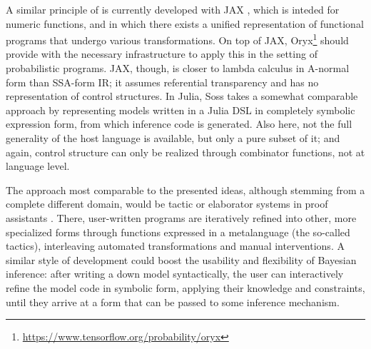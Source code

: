 A similar principle of is currently developed with JAX \parencite{bradbury2018jax}, which is inteded
for numeric functions, and in which there exists a unified representation of functional programs
that undergo various transformations.  On top of JAX,
Oryx\footnote{\protect\url{https://www.tensorflow.org/probability/oryx}} should provide with the
necessary infrastructure to apply this in the setting of probabilistic programs.  JAX, though, is
closer to lambda calculus in A-normal form than SSA-form IR; it assumes referential transparency and
has no representation of control structures.  In Julia, Soss \parencite{scherrer2019soss} takes a
somewhat comparable approach by representing models written in a Julia DSL in completely symbolic
expression form, from which inference code is generated.  Also here, not the full generality of the
host language is available, but only a pure subset of it; and again, control structure can only be
realized through combinator functions, not at language level.

The approach most comparable to the presented ideas, although stemming from a complete different
domain, would be tactic or elaborator systems in proof assistants
\parencite[e.g.,][]{brady2013idris,coqdevelopmentteam2010coq}.  There, user-written programs are
iteratively refined into other, more specialized forms through functions expressed in a metalanguage
(the so-called tactics), interleaving automated transformations and manual interventions.  A similar
style of development could boost the usability and flexibility of Bayesian inference: after writing
a down model syntactically, the user can interactively refine the model code in symbolic form,
applying their knowledge and constraints, until they arrive at a form that can be passed to some
inference mechanism.

